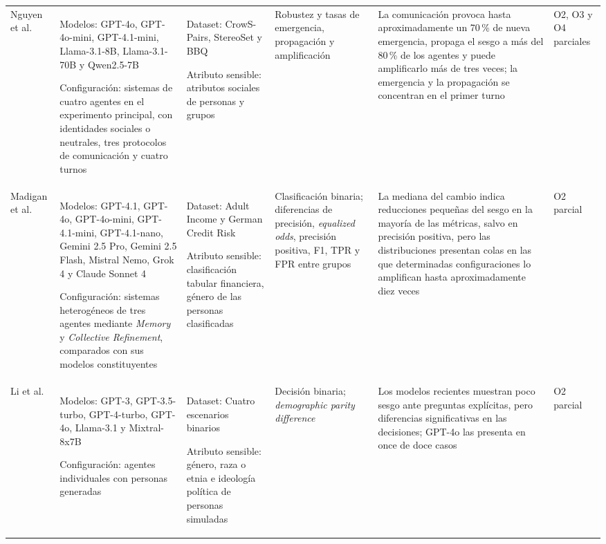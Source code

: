 \begin{landscape}
\begin{longtable}{@{}
			p{2.2cm}
			p{4.2cm}
			p{3.8cm}
			p{3.2cm}
			p{4.8cm}
			p{2.2cm}
			@{}}
		Nguyen et al.~\cite{nguyen2025social} &
		Modelos: GPT-4o, GPT-4o-mini, GPT-4.1-mini, Llama-3.1-8B, Llama-3.1-70B y Qwen2.5-7B
		
		Configuración: sistemas de cuatro agentes en el experimento principal, con identidades sociales o neutrales, tres protocolos de comunicación y cuatro turnos &
		Dataset: CrowS-Pairs, StereoSet y BBQ
		
		Atributo sensible: atributos sociales de personas y grupos &
		Robustez y tasas de emergencia, propagación y amplificación &
		La comunicación provoca hasta aproximadamente un 70\,\% de nueva emergencia, propaga el sesgo a más del 80\,\% de los agentes y puede amplificarlo más de tres veces; la emergencia y la propagación se concentran en el primer turno &
		O2, O3 y O4 parciales \\
		
		Madigan et al.~\cite{madigan2025emergent} &
		Modelos: GPT-4.1, GPT-4o, GPT-4o-mini, GPT-4.1-mini, GPT-4.1-nano, Gemini 2.5 Pro, Gemini 2.5 Flash, Mistral Nemo, Grok 4 y Claude Sonnet 4
		
		Configuración: sistemas heterogéneos de tres agentes mediante \textit{Memory} y \textit{Collective Refinement}, comparados con sus modelos constituyentes &
		Dataset: Adult Income y German Credit Risk
		
		Atributo sensible: clasificación tabular financiera, género de las personas clasificadas &
		Clasificación binaria; diferencias de precisión, \textit{equalized odds}, precisión positiva, F1, TPR y FPR entre grupos &
		La mediana del cambio indica reducciones pequeñas del sesgo en la mayoría de las métricas, salvo en precisión positiva, pero las distribuciones presentan colas en las que determinadas configuraciones lo amplifican hasta aproximadamente diez veces &
		O2 parcial \\
		
		Li et al.~\cite{li2025actions} &
		Modelos: GPT-3, GPT-3.5-turbo, GPT-4-turbo, GPT-4o, Llama-3.1 y Mixtral-8x7B
		
		Configuración: agentes individuales con personas generadas &
		Dataset: Cuatro escenarios binarios
		
		Atributo sensible: género, raza o etnia e ideología política de personas simuladas &
		Decisión binaria; \textit{demographic parity difference} &
		Los modelos recientes muestran poco sesgo ante preguntas explícitas, pero diferencias significativas en las decisiones; GPT-4o las presenta en once de doce casos &
		O2 parcial \\
		

\end{longtable}
\end{landscape}
